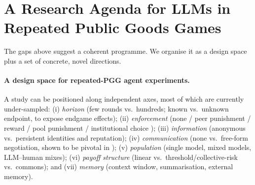 \documentclass[11pt,a4paper]{article}
\begin{document}
\section{A Research Agenda for LLMs in Repeated Public Goods Games}
\label{sec:agenda}

The gaps above suggest a coherent programme. We organise it as a design space
plus a set of concrete, novel directions.

\paragraph{A design space for repeated-PGG agent experiments.}
A study can be positioned along independent axes, most of which are currently
under-sampled: (i) \emph{horizon} (few rounds vs.\ hundreds; known vs.\ unknown
endpoint, to expose endgame effects); (ii) \emph{enforcement} (none / peer
punishment / reward / pool punishment / institutional choice
\citep{gurerk2006competitive,sigmund2010social}); (iii) \emph{information}
(anonymous vs.\ persistent identities and reputation); (iv) \emph{communication}
(none vs.\ free-form negotiation, shown to be pivotal in \citep{piatti2024govsim});
(v) \emph{population} (single model, mixed models, LLM--human mixes); (vi)
\emph{payoff structure} (linear vs.\ threshold/collective-risk vs.\ commons); and
(vii) \emph{memory} (context window, summarisation, external memory).
\end{document}
